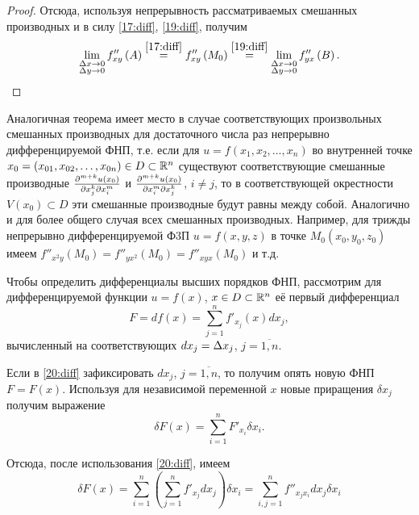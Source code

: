 \documentclass[../../main.tex]{subfiles}
\begin{document}
\begin{proof}
		Отсюда, используя непрерывность рассматриваемых смешанных 
		производных и в силу \eqref{17:diff}, \eqref{19:diff}, получим
		\[\lim_{
			\substack{\Delta x\rightarrow0\\
					\Delta y\rightarrow 0}
				}f''_{xy}\left(A\right)\overset{\eqref{17:diff}}{=}
		f''_{xy}\left(M_0\right)\overset{\eqref{19:diff}}{=}
		\lim_{
			\substack{\Delta x\rightarrow0\\
					\Delta y\rightarrow0}
				}f''_{yx}\left(B\right).\]
	\end{proof}

	\begin{rem}
		Аналогичная теорема имеет место в случае соответствующих 
		произвольных смешанных производных для достаточного числа 
		раз непрерывно дифференцируемой ФНП, т.е. если для 
		$u = f\left(x_1, x_2,\dots, x_n\right)$ во внутренней 
		точке $x_0 = \left(x_{01}, x_{02},\dots, x_{0n}\right)
		\in D\subset \mathbb{R}^n$ существуют соответствующие смешанные 
		производные $\frac{\partial ^{m+k}u\left(x_0\right)}{\partial x_j^k\partial x_i^m}$ и 
		$\frac{\partial ^{m+k}u\left(x_0\right)}{\partial x_i^m\partial x_j^k}$, $i\ne j$, 
		то в соответствующей окрестности $V\left(x_0\right)\subset D$ эти 
		смешанные производные будут равны между собой. Аналогично и для более 
		общего случая всех смешанных производных. Например, для трижды 
		непрерывно дифференцируемой Ф3П $u=f\left(x, y, z\right)$ в точке 
		$M_0\left(x_0, y_0, z_0\right)$ имеем
		$f''_{x^2y}\left(M_0\right) = f''_{yx^2}\left(M_0\right) = 
		f''_{xyx}\left(M_0\right)$ и т.д.
	\end{rem}

	Чтобы определить дифференциалы высших порядков ФНП, рассмотрим для 
	дифференцируемой функции $u=f\left(x\right)$, $x\in D\subset \mathbb{R}^n$ 
	её первый дифференциал
	\begin{equation}
		F = df\left(x\right) = \sum_{j = 1}^nf'_{x_j}\left(x\right)dx_j,
		\label{20:diff}
	\end{equation}
	вычисленный на соответствующих $dx_j = \Delta x_j$, $j = \overline{1, n}$.
	
	Если в \eqref{20:diff} зафиксировать $dx_j$, $j = \overline{1, n}$, то 
	получим опять новую ФНП $F = F(x)$. Используя для независимой переменной 
	$x$ новые приращения $\delta x_j$ получим выражение
	\[\delta F(x) = \sum_{i = 1}^nF'_{x_i}\delta x_i.\]
	
	Отсюда, после использования \eqref{20:diff}, имеем
	\begin{equation}
		\delta F(x) = \sum_{i = 1}^n\left(\sum_{j = 1}^nf'_{x_j}dx_j\right)
		\delta x_i = \sum_{i, j = 1}^nf''_{x_jx_i}dx_j\delta x_i
		\label{21:diff}
	\end{equation}
	
\end{document}
